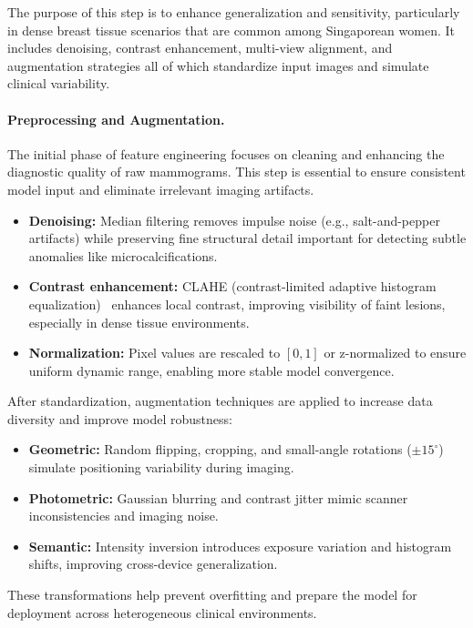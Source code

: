 \documentclass[12pt]{article}
\begin{document}
The purpose of this step is to enhance generalization and sensitivity, particularly in dense breast tissue scenarios that are common among Singaporean women. It includes denoising, contrast enhancement, multi-view alignment, and augmentation strategies all of which standardize input images and simulate clinical variability. 

\paragraph{Preprocessing and Augmentation.}
The initial phase of feature engineering focuses on cleaning and enhancing the diagnostic quality of raw mammograms. This step is essential to ensure consistent model input and eliminate irrelevant imaging artifacts.

\begin{itemize}
    \item \textbf{Denoising:} Median filtering removes impulse noise (e.g., salt-and-pepper artifacts) while preserving fine structural detail important for detecting subtle anomalies like microcalcifications.
    \item \textbf{Contrast enhancement:} CLAHE (contrast-limited adaptive histogram equalization)~\cite{14} enhances local contrast, improving visibility of faint lesions, especially in dense tissue environments.
    \item \textbf{Normalization:} Pixel values are rescaled to $[0,1]$ or z-normalized to ensure uniform dynamic range, enabling more stable model convergence.
\end{itemize}

After standardization, augmentation techniques are applied to increase data diversity and improve model robustness:

\begin{itemize}
    \item \textbf{Geometric:} Random flipping, cropping, and small-angle rotations ($\pm15^{\circ}$) simulate positioning variability during imaging.
    \item \textbf{Photometric:} Gaussian blurring and contrast jitter mimic scanner inconsistencies and imaging noise.
    \item \textbf{Semantic:} Intensity inversion introduces exposure variation and histogram shifts, improving cross-device generalization.
\end{itemize}

These transformations help prevent overfitting and prepare the model for deployment across heterogeneous clinical environments.
\end{document}
